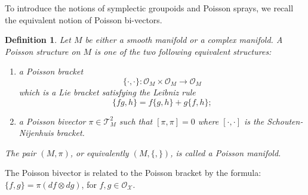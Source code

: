 \documentclass{amsart}
\newtheorem{definition}[theorem]{Definition}
\newcommand{\cO}{\mathcal{O}}
\newcommand{\cX}{\mathcal{X}}
\newcommand{\cT}{\mathcal{T}}
\begin{document}
To introduce the notions of symplectic groupoids and Poisson sprays, we recall the equivalent notion of Poisson bi-vectors.

\begin{definition}
Let $M$ be either a smooth manifold or a complex manifold. A Poisson structure on $M$ is one of the two following equivalent structures:
  \begin{enumerate}
    \item a Poisson bracket
      $$
				\{\cdot, \cdot\}: \cO_M \times \cO_M \to \cO_M
			$$
			which is a Lie bracket satisfying the Leibniz rule
			$$
				\{fg, h\} = f\{g,h\} + g\{f,h\};
			$$
		\item a Poisson bivector $\pi \in \cT^2_M$ such that $[\pi, \pi] = 0$ where $[\cdot, \cdot]$ is the Schouten-Nijenhuis bracket.
\end{enumerate}	
The pair $(M, \pi)$, or equivalently $(M, \{,\})$, is called a Poisson manifold.
\end{definition}

The Poisson bivector is related to the Poisson bracket by the formula: $\{f, g\} = \pi (df \otimes dg)$, for $f, g\in \cO_\cX$.
\end{document}

